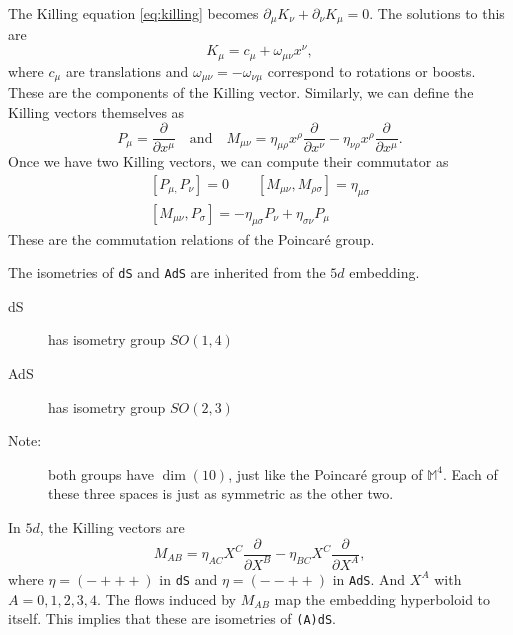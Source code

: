 \begin{example}
  The Killing equation \eqref{eq:killing} becomes $\partial_{\mu} K_{\nu} + \partial_{\nu} K_{\mu} = 0$. The solutions to this are
  \begin{equation}
    K_{\mu} = c_{\mu} + \omega_{\mu\nu} x^{\nu} ,
  \end{equation}
  where $c_{\mu}$ are translations and $\omega_{\mu\nu} = -\omega_{\nu\mu}$ correspond to rotations or boosts.
  These are the components of the Killing vector.
  Similarly, we can define the Killing vectors themselves as
  \begin{equation}
    P_{\mu} = \frac{\partial^{} }{\partial x^{\mu}} \quad \text{and} \quad M_{\mu\nu} = \eta_{\mu\rho} x^{\rho} \frac{\partial^{} }{\partial x^{\nu}} - \eta_{\nu\rho} x^{\rho} \frac{\partial^{} }{\partial x^{\mu}}.
  \end{equation}
  Once we have two Killing vectors, we can compute their commutator as 
  \begin{equation}
    \begin{gathered}
      [P_{\mu,} P_{\nu}] = 0 \qquad
      [M_{\mu\nu} , M_{\rho\sigma}] = \eta_{\mu\sigma} \\
      [M_{\mu\nu} , P_{\sigma}] = -\eta_{\mu\sigma} P_{\nu} + \eta _{\sigma\nu} P_{\mu}
    \end{gathered}
  \end{equation}
  These are the commutation relations of the Poincar\'e group.
\end{example}
\begin{example}[]
  The isometries of \texttt{dS} and \texttt{AdS} are inherited from the $5d$ embedding.
  \begin{description}
    \item[dS] has isometry group $SO(1, 4)$
    \item[AdS] has isometry group $SO(2, 3)$
    \item[Note:] both groups have $\dim(10)$, just like the Poincar\'e group of $\mathbb{M}^4$. Each of these three spaces is just as symmetric as the other two.
  \end{description}
  In $5d$, the Killing vectors are 
  \begin{equation}
    M_{AB} = \eta_{AC} X^{C} \frac{\partial^{} }{\partial X^{B}} - \eta_{BC} X^{C} \frac{\partial^{} }{\partial X^{A}},
  \end{equation}
  where $\eta = (- + + +)$ in \texttt{dS} and $\eta = (- - + + )$ in \texttt{AdS}. And $X^{A}$ with $A = 0,1,2,3,4$.
  The flows induced by $M_{AB}$ map the embedding hyperboloid to itself. This implies that these are isometries of \texttt{(A)dS}.
\end{example}
